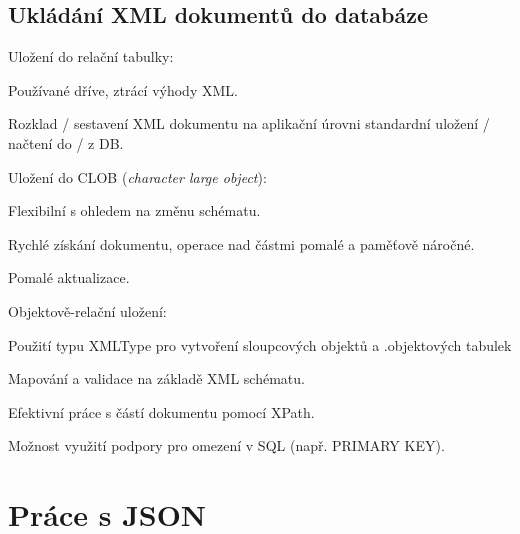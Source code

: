 \subsection{Ukládání XML dokumentů do databáze}

\begin{compactitem}
    \item Uložení do relační tabulky: \begin{compactitem}
        \item Používané dříve, ztrácí výhody XML.
        \item Rozklad / sestavení XML dokumentu na aplikační úrovni standardní uložení / načtení do / z DB.
    \end{compactitem}
    \item Uložení do CLOB (\textit{character large object}): \begin{compactitem}
        \item Flexibilní s ohledem na změnu schématu.
        \item Rychlé získání dokumentu, operace nad částmi pomalé a paměťově náročné.
        \item Pomalé aktualizace.
    \end{compactitem}
    \item Objektově-relační uložení: \begin{compactitem}
        \item Použití typu XMLType pro vytvoření sloupcových objektů a .objektových tabulek
        \item Mapování a validace na základě XML schématu.
        \item Efektivní práce s částí dokumentu pomocí XPath.
        \item Možnost využití podpory pro omezení v SQL (např. PRIMARY KEY).
    \end{compactitem}
\end{compactitem}


\section{Práce s JSON}

